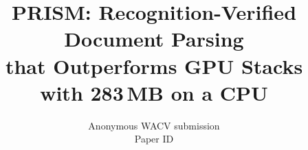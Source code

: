 \documentclass[10pt,twocolumn,letterpaper]{article}
\title{PRISM: Recognition-Verified Document Parsing\\ that Outperforms GPU Stacks with 283\,MB on a CPU}
\author{Anonymous WACV submission\\
Paper ID \paperID}
\begin{document}
\maketitle






{
    \small
    
    
}
\end{document}
